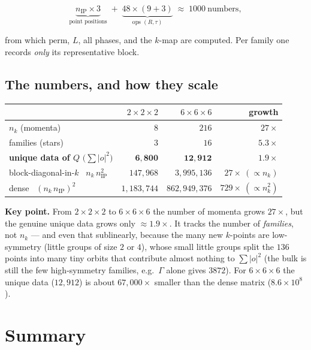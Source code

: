 \documentclass[11pt]{article}
\begin{document}
\[
  \underbrace{n_{\mathrm{IP}}\times 3}_{\text{point positions}}
  \;+\;\underbrace{48\times(9+3)}_{\text{ops }(R,\tau)}
  \;\approx\; 1000\ \text{numbers},
\]

from which $\mathrm{perm}$, $L$, all phases, and the $k$-map are computed. Per family one records
\emph{only} its representative block.

\subsection*{The numbers, and how they scale}

\begin{center}
\begin{tabular}{lrrr}
\toprule
 & $2\times2\times2$ & $6\times6\times6$ & growth \\
\midrule
$n_k$ (momenta) & $8$ & $216$ & $27\times$ \\
families (stars) & $3$ & $16$ & $5.3\times$ \\
\textbf{unique data of $Q$} $\big(\sum|o|^2\big)$ & $\mathbf{6{,}800}$ & $\mathbf{12{,}912}$ & $\mathbf{1.9\times}$ \\
block-diagonal-in-$k$ \ $n_k\,n_{\mathrm{IP}}^2$ & $147{,}968$ & $3{,}995{,}136$ & $27\times\ (\propto n_k)$ \\
dense \ $(n_k\,n_{\mathrm{IP}})^2$ & $1{,}183{,}744$ & $862{,}949{,}376$ & $729\times\ (\propto n_k^2)$ \\
\bottomrule
\end{tabular}
\end{center}

\textbf{Key point.} From $2\times2\times2$ to $6\times6\times6$ the number of momenta grows $27\times$,
but the genuine unique data grows only $\approx 1.9\times$. It tracks the number of \emph{families},
not $n_k$ --- and even that sublinearly, because the many new $k$-points are low-symmetry (little
groups of size $2$ or $4$), whose small little groups split the $136$ points into many tiny orbits
that contribute almost nothing to $\sum|o|^2$ (the bulk is still the few high-symmetry families, e.g.\
$\Gamma$ alone gives $3872$). For $6\times6\times6$ the unique data ($12{,}912$) is about
$67{,}000\times$ smaller than the dense matrix ($8.6\times10^8$).

\section*{Summary}
\end{document}

